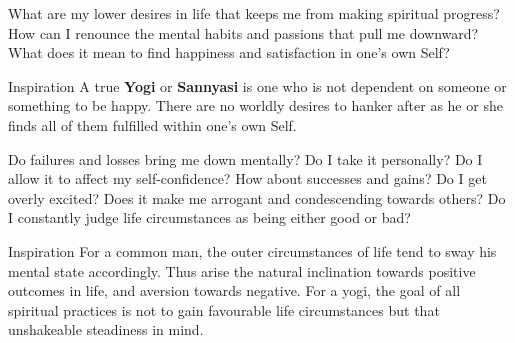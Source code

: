\newpage
\begin{mananam}{}
\mananamtext What are my lower desires in life that keeps me from making spiritual progress? How can I renounce the mental habits and passions that pull me downward? What does it mean to find happiness and satisfaction in one’s own Self?
\end{mananam}
\WritingHand{}
\begin{inspiration}{\mananamfont Inspiration}
\mananamtext A true \textbf{Yogi} or \textbf{Sannyasi} is one who is not dependent on someone or something to be happy. There are no worldly desires to hanker after as he or she finds all of them fulfilled within one’s own Self.
\end{inspiration}
\newpage


\newpage
\begin{mananam}{}
\mananamtext Do failures and losses bring me down mentally? Do I take it personally? Do I allow it to affect my self-confidence? How about successes and gains? Do I get overly excited? Does it make me arrogant and condescending towards others? Do I constantly judge life circumstances as being either good or bad?
\end{mananam}
\WritingHand{}
\begin{inspiration}{\mananamfont Inspiration}
\mananamtext For a common man, the outer circumstances of life tend to sway his mental state accordingly. Thus arise the natural inclination towards positive outcomes in life, and aversion towards negative. For a yogi, the goal of all spiritual practices is not to gain favourable life circumstances but that unshakeable steadiness in mind.
\end{inspiration}
\newpage

